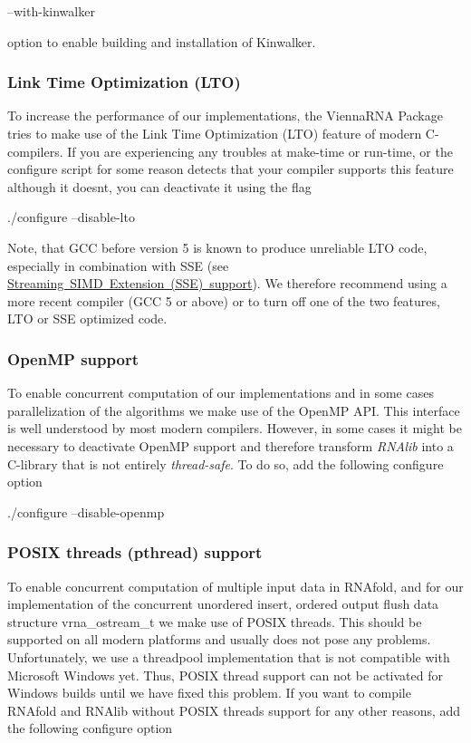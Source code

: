 \begin{DoxyVerb}--with-kinwalker
\end{DoxyVerb}


option to enable building and installation of Kinwalker.\hypertarget{install_config_lto}{}\subsubsection{Link Time Optimization (\+L\+T\+O)}\label{install_config_lto}
To increase the performance of our implementations, the Vienna\+R\+NA Package tries to make use of the Link Time Optimization (L\+TO) feature of modern C-\/compilers. If you are experiencing any troubles at make-\/time or run-\/time, or the configure script for some reason detects that your compiler supports this feature although it doesn\textquotesingle{}t, you can deactivate it using the flag

\begin{DoxyVerb}./configure --disable-lto
\end{DoxyVerb}


Note, that G\+CC before version 5 is known to produce unreliable L\+TO code, especially in combination with S\+SE (see \mbox{\hyperlink{install_config_sse}{Streaming S\+I\+MD Extension (S\+SE) support}}). We therefore recommend using a more recent compiler (G\+CC 5 or above) or to turn off one of the two features, L\+TO or S\+SE optimized code.\hypertarget{install_config_openmp}{}\subsubsection{Open\+M\+P support}\label{install_config_openmp}
To enable concurrent computation of our implementations and in some cases parallelization of the algorithms we make use of the Open\+MP A\+PI. This interface is well understood by most modern compilers. However, in some cases it might be necessary to deactivate Open\+MP support and therefore transform {\itshape R\+N\+Alib} into a C-\/library that is not entirely {\itshape thread-\/safe}. To do so, add the following configure option

\begin{DoxyVerb}./configure --disable-openmp
\end{DoxyVerb}
\hypertarget{install_config_pthread}{}\subsubsection{P\+O\+S\+I\+X threads (pthread) support}\label{install_config_pthread}
To enable concurrent computation of multiple input data in R\+N\+Afold, and for our implementation of the concurrent unordered insert, ordered output flush data structure vrna\+\_\+ostream\+\_\+t we make use of P\+O\+S\+IX threads. This should be supported on all modern platforms and usually does not pose any problems. Unfortunately, we use a threadpool implementation that is not compatible with Microsoft Windows yet. Thus, P\+O\+S\+IX thread support can not be activated for Windows builds until we have fixed this problem. If you want to compile R\+N\+Afold and R\+N\+Alib without P\+O\+S\+IX threads support for any other reasons, add the following configure option

